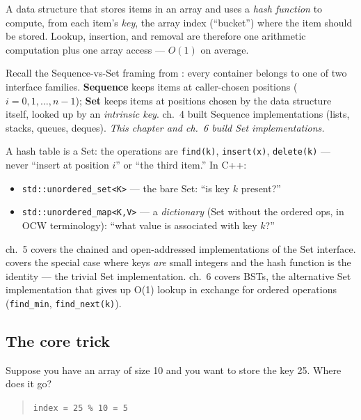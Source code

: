 \documentclass[11pt]{article}
\begin{document}
\begin{defnbox}
A data structure that stores items in an array and uses a
\emph{hash function} to compute, from each item's \emph{key}, the
array index (``bucket'') where the item should be stored. Lookup,
insertion, and removal are therefore one arithmetic computation
plus one array access --- $O(1)$ on average.
\end{defnbox}

\begin{notebox}
Recall the Sequence-vs-Set framing from : every
container belongs to one of two interface families. \textbf{Sequence}
keeps items at caller-chosen positions ($i = 0, 1, \ldots, n-1$);
\textbf{Set} keeps items at positions chosen by the data structure
itself, looked up by an \emph{intrinsic key}. ch.~4 built Sequence
implementations (lists, stacks, queues, deques). \emph{This chapter
and ch.~6 build Set implementations.}

A hash table is a Set: the operations are \texttt{find(k)},
\texttt{insert(x)}, \texttt{delete(k)} --- never ``insert at position
$i$'' or ``the third item.'' In C++:
\begin{itemize}[leftmargin=*]
  \item \texttt{std::unordered\_set<K>} --- the bare Set: ``is key
        $k$ present?''
  \item \texttt{std::unordered\_map<K,V>} --- a \emph{dictionary}
        (Set without the ordered ops, in OCW terminology): ``what
        value is associated with key $k$?''
\end{itemize}
ch.~5 covers the chained and open-addressed implementations of the
Set interface.  covers the special case where keys
\emph{are} small integers and the hash function is the identity ---
the trivial Set implementation. ch.~6 covers BSTs, the alternative
Set implementation that gives up O(1) lookup in exchange for
ordered operations (\texttt{find\_min}, \texttt{find\_next(k)}).
\end{notebox}

\subsection*{The core trick}

Suppose you have an array of size 10 and you want to store the
key 25. Where does it go?

\begin{quote}
\texttt{index = 25 \% 10 = 5}
\end{quote}
\end{document}
